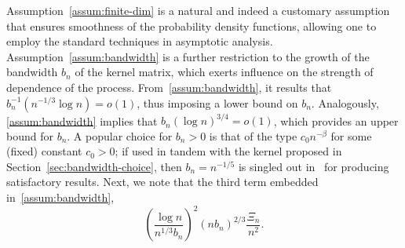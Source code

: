 \documentclass[aos]{imsart}
\theoremstyle{plain}
\theoremstyle{remark}
\begin{document}
Assumption~\ref{assum:finite-dim} is a natural and indeed a customary assumption that ensures smoothness of the probability density functions, allowing one to employ the standard techniques in asymptotic analysis. Assumption~\ref{assum:bandwidth} is a further restriction to the growth of the bandwidth $b_n$ of the kernel matrix, which exerts influence on the strength of dependence of the process. From~\ref{assum:bandwidth}, it results that $b_n^{-1} (n^{-1/3} \log n) = o(1)$, thus imposing a lower bound on $b_n$. Analogously, \ref{assum:bandwidth} implies that $b_n (\log n)^{3/4} = o(1)$, which provides an upper bound for $b_n$. A popular  choice for $b_n>0$ is that of the type $c_0n^{-\beta}$ for some (fixed) constant $c_0>0$; if used in tandem with the kernel proposed in Section~\ref{sec:bandwidth-choice}, then $b_n = n^{-1/5}$ is singled out  in~\citet{zhao2008confidence} for producing satisfactory results. Next, we note that the third term embedded in~\ref{assum:bandwidth},
%
\begin{equation*}
    \left( \dfrac{\log n}{n^{1/3} b_n} \right)^2 \left( nb_n \right)^{2/3} \frac{\Xi_n}{n^2}.
\end{equation*}
%
\end{document}
